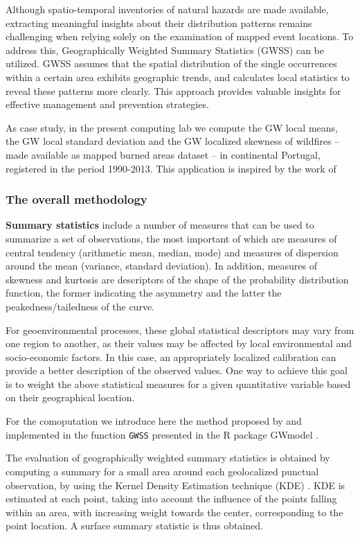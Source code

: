 \documentclass[
]{article}
\begin{document}
Although spatio-temporal inventories of natural hazards are made available, extracting meaningful insights about their distribution patterns remains challenging when relying solely on the examination of mapped event locations. To address this, Geographically Weighted Summary Statistics (GWSS) can be utilized. GWSS assumes that the spatial distribution of the single occurrences within a certain area exhibits geographic trends, and calculates local statistics to reveal these patterns more clearly. This approach provides valuable insights for effective management and prevention strategies.

As case study, in the present computing lab we compute the GW local means, the GW local standard deviation and the GW localized skewness of wildfires -- made available as mapped burned areas dataset -- in continental Portugal, registered in the period 1990-2013. This application is inspired by the work of \citep{tonini_evolution_2017}

\subsubsection{The overall methodology}\label{the-overall-methodology}

\textbf{Summary statistics} include a number of measures that can be used to summarize a set of observations, the most important of which are measures of central tendency (arithmetic mean, median, mode) and measures of dispersion around the mean (variance, standard deviation). In addition, measures of skewness and kurtosis are descriptors of the shape of the probability distribution function, the former indicating the asymmetry and the latter the peakedness/tailedness of the curve.

For geoenvironmental processes, these global statistical descriptors may vary from one region to another, as their values may be affected by local environmental and socio-economic factors. In this case, an appropriately localized calibration can provide a better description of the observed values. One way to achieve this goal is to weight the above statistical measures for a given quantitative variable based on their geographical location.

For the comoputation we introduce here the method proposed by \citep{brunsdon_geographically_2002} and implemented in the function \texttt{GWSS} presented in the R package GWmodel \citep{lu_gwmodel_2014, Gollini_2015}.

The evaluation of geographically weighted summary statistics is obtained by computing a summary for a small area around each geolocalized punctual observation, by using the Kernel Density Estimation technique (KDE) \citep{brunsdon_estimating_1995}. KDE is estimated at each point, taking into account the influence of the points falling within an area, with increasing weight towards the center, corresponding to the point location. A surface summary statistic is thus obtained.
\end{document}
